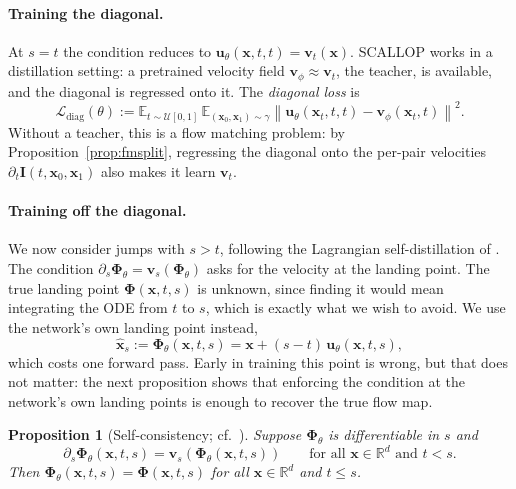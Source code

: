 \documentclass[11pt,a4paper]{article}
\numberwithin{equation}{section}     %
\theoremstyle{plain}        %
\newtheorem{proposition}[theorem]{Proposition}
\theoremstyle{definition}   %
\theoremstyle{remark}       %
\begin{document}
\paragraph{Training the diagonal.} At $s=t$ the condition reduces to $\mathbf{u}_\theta(\mathbf{x},t,t)=\mathbf{v}_t(\mathbf{x})$. SCALLOP \citep{ouyang2026} works in a distillation setting: a pretrained velocity field $\mathbf{v}_\phi\approx\mathbf{v}_t$, the teacher, is available, and the diagonal is regressed onto it. The \emph{diagonal loss} is
\[
\mathcal{L}_{\mathrm{diag}}(\theta):=\mathbb{E}_{t\sim\mathcal{U}[0,1]}\,\mathbb{E}_{(\mathbf{x}_0,\mathbf{x}_1)\sim\gamma}\left\|\mathbf{u}_\theta(\mathbf{x}_t,t,t)-\mathbf{v}_\phi(\mathbf{x}_t,t)\right\|^2 .
\]
Without a teacher, this is a flow matching problem: by Proposition~\ref{prop:fmsplit}, regressing the diagonal onto the per-pair velocities $\partial_t\mathbf{I}(t,\mathbf{x}_0,\mathbf{x}_1)$ also makes it learn $\mathbf{v}_t$.

\paragraph{Training off the diagonal.} We now consider jumps with $s>t$, following the Lagrangian self-distillation of \citet{boffi2025build}. The condition $\partial_s\boldsymbol{\Phi}_\theta=\mathbf{v}_s(\boldsymbol{\Phi}_\theta)$ asks for the velocity at the landing point. The true landing point $\boldsymbol{\Phi}(\mathbf{x},t,s)$ is unknown, since finding it would mean integrating the ODE from $t$ to $s$, which is exactly what we wish to avoid. We use the network's own landing point instead,
\[
\hat{\mathbf{x}}_s:=\boldsymbol{\Phi}_\theta(\mathbf{x},t,s)=\mathbf{x}+(s-t)\,\mathbf{u}_\theta(\mathbf{x},t,s),
\]
which costs one forward pass. Early in training this point is wrong, but that does not matter: the next proposition shows that enforcing the condition at the network's own landing points is enough to recover the true flow map.

\begin{proposition}[Self-consistency; cf.\ \citealp{boffi2025build}]\label{prop:selfcons}
Suppose $\boldsymbol{\Phi}_\theta$ is differentiable in $s$ and
\[
\partial_s\boldsymbol{\Phi}_\theta(\mathbf{x},t,s)=\mathbf{v}_s\left(\boldsymbol{\Phi}_\theta(\mathbf{x},t,s)\right)\qquad\text{for all }\mathbf{x}\in\mathbb{R}^d\text{ and }t<s .
\]
Then $\boldsymbol{\Phi}_\theta(\mathbf{x},t,s)=\boldsymbol{\Phi}(\mathbf{x},t,s)$ for all $\mathbf{x}\in\mathbb{R}^d$ and $t\le s$.
\end{proposition}
\end{document}
